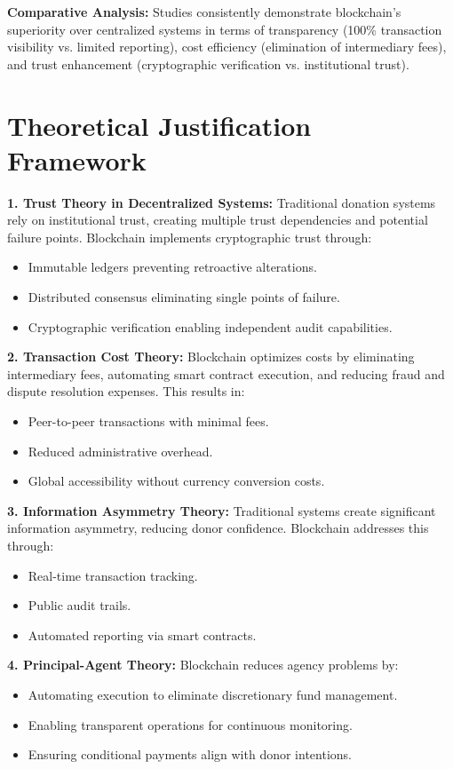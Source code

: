 \documentclass[a4paper,12pt]{report}
\begin{document}
	\textbf{Comparative Analysis:} Studies consistently demonstrate blockchain's superiority over centralized systems in terms of transparency (100\% transaction visibility vs. limited reporting), cost efficiency (elimination of intermediary fees), and trust enhancement (cryptographic verification vs. institutional trust).

\section{Theoretical Justification Framework}
	\textbf{1. Trust Theory in Decentralized Systems:}
Traditional donation systems rely on institutional trust, creating multiple trust dependencies and potential failure points. Blockchain implements cryptographic trust through:
\begin{itemize}
    \item Immutable ledgers preventing retroactive alterations.
    \item Distributed consensus eliminating single points of failure.
    \item Cryptographic verification enabling independent audit capabilities.
\end{itemize}

	\textbf{2. Transaction Cost Theory:}
Blockchain optimizes costs by eliminating intermediary fees, automating smart contract execution, and reducing fraud and dispute resolution expenses. This results in:
\begin{itemize}
    \item Peer-to-peer transactions with minimal fees.
    \item Reduced administrative overhead.
    \item Global accessibility without currency conversion costs.
\end{itemize}

	\textbf{3. Information Asymmetry Theory:}
Traditional systems create significant information asymmetry, reducing donor confidence. Blockchain addresses this through:
\begin{itemize}
    \item Real-time transaction tracking.
    \item Public audit trails.
    \item Automated reporting via smart contracts.
\end{itemize}

	\textbf{4. Principal-Agent Theory:}
Blockchain reduces agency problems by:
\begin{itemize}
    \item Automating execution to eliminate discretionary fund management.
    \item Enabling transparent operations for continuous monitoring.
    \item Ensuring conditional payments align with donor intentions.
\end{itemize}
\end{document}
